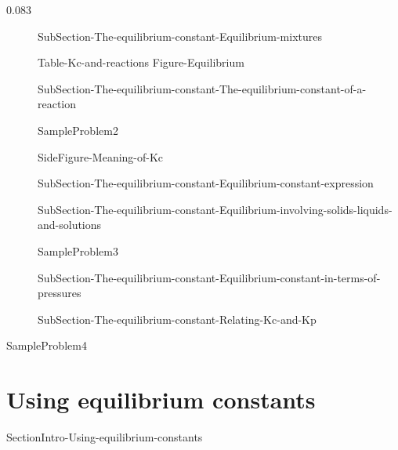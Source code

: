 0.083\documentclass[main.tex]{subfiles}
\begin{document}
\sloppy\begin{description}



\item[] {SubSection-The-equilibrium-constant-Equilibrium-mixtures}



 {Table-Kc-and-reactions}\newpage
{Figure-Equilibrium}

\item[] {SubSection-The-equilibrium-constant-The-equilibrium-constant-of-a-reaction}



  {SampleProblem2}

{SideFigure-Meaning-of-Kc}






\item[] {SubSection-The-equilibrium-constant-Equilibrium-constant-expression}

 
\item[] {SubSection-The-equilibrium-constant-Equilibrium-involving-solids-liquids-and-solutions}


  {SampleProblem3}


\item[] {SubSection-The-equilibrium-constant-Equilibrium-constant-in-terms-of-pressures}



\item[] {SubSection-The-equilibrium-constant-Relating-Kc-and-Kp}



\end{description}
  {SampleProblem4}











\section{ {Using equilibrium constants}}   {SectionIntro-Using-equilibrium-constants}
\end{document}
